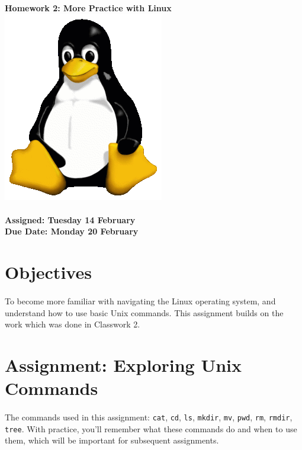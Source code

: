 \documentclass[letter,11pt]{article}
\begin{document}
\huge
\textbf{Homework 2: More Practice with Linux} \includegraphics[scale=0.07]{Images/Tux.png}
\normalsize
\\ ~~ \\
\textbf{Assigned: Tuesday 14 February} \\
\textbf{Due Date: Monday 20 February}

\section*{Objectives}
\paragraph{}To become more familiar with navigating the Linux operating system, and understand how to use basic Unix commands. This assignment builds on the work which was done in Classwork 2.

\section*{Assignment: Exploring Unix Commands}
\paragraph{}The commands used in this assignment: \texttt{cat}, \texttt{cd}, \texttt{ls}, \texttt{mkdir}, \texttt{mv}, \texttt{pwd}, \texttt{rm}, \texttt{rmdir}, \texttt{tree}. With practice, you'll remember what these commands do and when to use them, which will be important for subsequent assignments.
\end{document}
